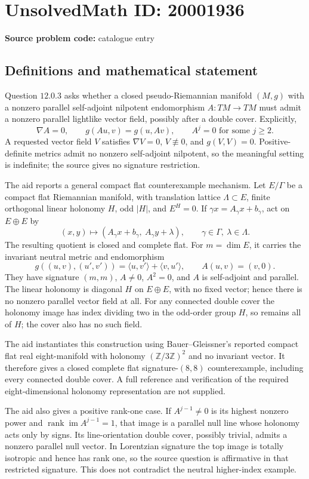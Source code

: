 \documentclass[11pt]{article}
\newcommand{\Z}{\mathbb{Z}}
\begin{document}
\section*{UnsolvedMath ID: 20001936}
\textbf{Source problem code:} catalogue entry
\subsection{Definitions and mathematical statement}
Question \(12.0.3\) asks whether a closed pseudo-Riemannian manifold \((M,g)\) with a nonzero parallel self-adjoint nilpotent endomorphism \(A:TM\to TM\) must admit a nonzero parallel lightlike vector field, possibly after a double cover. Explicitly,
\[
 \nabla A=0,\qquad g(Au,v)=g(u,Av),\qquad A^j=0\text{ for some }j\geq2.
\]
A requested vector field \(V\) satisfies \(\nabla V=0\), \(V\not\equiv0\), and \(g(V,V)=0\). Positive-definite metrics admit no nonzero self-adjoint nilpotent, so the meaningful setting is indefinite; the source gives no signature restriction.

The aid reports a general compact flat counterexample mechanism. Let \(E/\Gamma\) be a compact flat Riemannian manifold, with translation lattice \(\Lambda\subset E\), finite orthogonal linear holonomy \(H\), odd \(|H|\), and \(E^H=0\). If \(\gamma x=A_\gamma x+b_\gamma\), act on \(E\oplus E\) by
\[
 (x,y)\longmapsto(A_\gamma x+b_\gamma,\ A_\gamma y+\lambda),
 \qquad \gamma\in\Gamma,\ \lambda\in\Lambda.
\]
The resulting quotient is closed and complete flat. For \(m=\dim E\), it carries the invariant neutral metric and endomorphism
\[
 g((u,v),(u',v'))=\langle u,v'\rangle+\langle v,u'\rangle,
 \qquad A(u,v)=(v,0).
\]
They have signature \((m,m)\), \(A\ne0\), \(A^2=0\), and \(A\) is self-adjoint and parallel. The linear holonomy is diagonal \(H\) on \(E\oplus E\), with no fixed vector; hence there is no nonzero parallel vector field at all. For any connected double cover the holonomy image has index dividing two in the odd-order group \(H\), so remains all of \(H\); the cover also has no such field.

The aid instantiates this construction using Bauer--Gleissner's reported compact flat real eight-manifold with holonomy \((\Z/3\Z)^2\) and no invariant vector. It therefore gives a closed complete flat signature-\((8,8)\) counterexample, including every connected double cover. A full reference and verification of the required eight-dimensional holonomy representation are not supplied.

The aid also gives a positive rank-one case. If \(A^{j-1}\ne0\) is its highest nonzero power and \(\operatorname{rank}\operatorname{im}A^{j-1}=1\), that image is a parallel null line whose holonomy acts only by signs. Its line-orientation double cover, possibly trivial, admits a nonzero parallel null vector. In Lorentzian signature the top image is totally isotropic and hence has rank one, so the source question is affirmative in that restricted signature. This does not contradict the neutral higher-index example.
\end{document}
